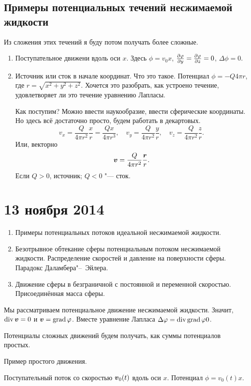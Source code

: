 \subsection{Примеры потенциальных течений несжимаемой жидкости}
Из сложения этих течений я буду потом получать более сложные.
\begin{enumerate}
  \item Поступательное движени вдоль оси $x$. Здесь $\phi = v_0 x$, $\frac{\partial \varphi}{\partial y} = \frac{\partial \varphi}{\partial z} = 0$, $\Delta \phi = 0$.
  \item Источник или сток в начале координат. Что это такое. Потенциал $\phi = - Q{4\pi r}$, где $r = \sqrt{x^2+y^2+z^2}$. Хочется это разобрать, как устроено течение, удовлетворяет ли это течение уравнению Лапласы.

Как поступим? Можно ввести наукообразие, ввести сферические координаты. Но здесь всё достаточно просто, будем работать в декартовых.
\[
  v_x = \frac{Q}{4\pi r^2}\frac{x}r = \frac{Qx}{4\pi r^3},\quad v_y = \frac Q{4\pi r^2}\frac yr,\quad v_z = \frac Q{4\pi r^2}\frac zr.
\]
Или, векторно
\[
  \boldsymbol{v} = \frac{Q}{4\pi r^2}\frac{\boldsymbol{r}}{r}.
\]
Если $Q>0$, источник; $Q<0$ "--- сток.
\end{enumerate}
\section{13 ноября 2014}

\begin{enumerate}
  \item Примеры потенциальных потоков идеальной несжимаемой жидкости.
  \item Безотрывное обтекание сферы потенциальным потоком несжимаемой жидкости.
    Распределение скоростей и давление на поверхности сферы. Парадокс Даламбера"--~Эйлера.
  \item Движение сферы в безграничной с постоянной и переменной скоростью. Присоединённая масса сферы.
\end{enumerate}

Мы рассматриваем потенциальное движение несжимаемой жидкости. Значит, $\operatorname{div}\boldsymbol{v} = 0$ и $\boldsymbol{v} = \operatorname{grad} \varphi$. Вместе уравнение Лапласа $\Delta \varphi = \operatorname{div}\operatorname{grad} \varphi 0$.

Потенциалы сложных движений будем получать, как суммы потенциалов простых.

Пример простого движения.
\begin{Exa}
  Поступательный поток со скоростью $\boldsymbol{v}_0(t)$ вдоль оси $x$. Потенциал $\phi = v_0(t) x$.
\end{Exa}

